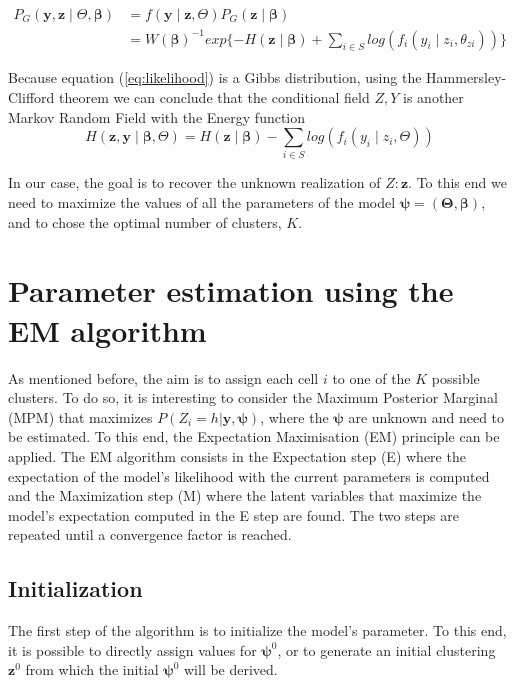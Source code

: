 \begin{align}
\label{eq:likelihood}
P_G(\boldsymbol{y},\boldsymbol{z} \mid \Theta, \boldsymbol{\beta}) &= f(\boldsymbol{y} \mid \boldsymbol{z}, \Theta)P_G(\boldsymbol{z} \mid \boldsymbol{\beta})\nonumber\\
&= W(\boldsymbol{\beta})^{-1}exp\{{-H(\boldsymbol{z} \mid \boldsymbol{\beta})} + \sum\limits_{i \in S}log(f_i(y_i \mid z_i, \theta_{zi}))\}
\end{align}

Because equation (\ref{eq:likelihood}) is a Gibbs distribution, using the Hammersley-Clifford theorem we can conclude that the conditional field $Z, Y$ is another Markov Random Field with the Energy function 
\[H(\boldsymbol{z}, \boldsymbol{y} \mid \boldsymbol{\beta}, \Theta) = H(\boldsymbol{z} \mid \boldsymbol{\beta}) - \sum\limits_{i \in S} log(f_i(y_i \mid z_i, \Theta))\]

In our case, the goal is to recover the unknown realization of $Z: \boldsymbol{z}$. To this end we need to maximize the values of all the parameters of the model $\boldsymbol{\psi} = (\boldsymbol{\Theta}, \boldsymbol{\beta})$, and to chose the optimal number of clusters, $K$.

\section{Parameter estimation using the EM algorithm}
As mentioned before, the aim is to assign each cell $i$ to one of the $K$ possible clusters. To do so, it is interesting to consider the Maximum Posterior Marginal (MPM) that maximizes $P(Z_{i}=h|\boldsymbol{y}, \boldsymbol{\psi})$, where the $\boldsymbol{\psi}$ are unknown and need to be estimated. To this end, the Expectation Maximisation \cite{dempster77} (EM) principle can be applied. The EM algorithm consists in the Expectation step (E) where the expectation of the model's likelihood with the current parameters is computed and the Maximization step (M) where the latent variables that maximize the model's expectation computed in the E step are found. The two steps are repeated until a convergence factor is reached.\\

	\subsection{Initialization}
The first step of the algorithm is to initialize the model's parameter. To this end, it is possible to directly assign values for $\boldsymbol{\psi}^{0}$, or to generate an initial clustering $\boldsymbol{z}^{0}$ from which the initial $\boldsymbol{\psi}^{0}$ will be derived.\\

